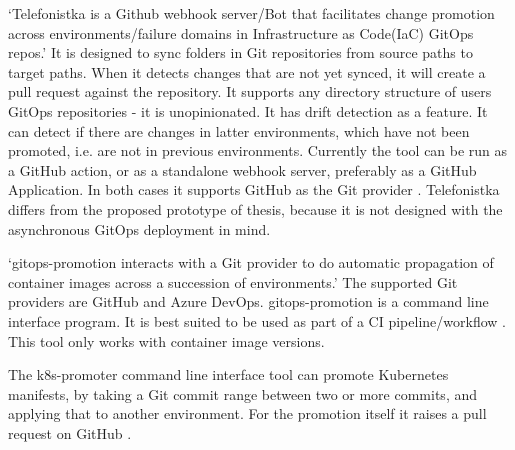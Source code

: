 \enquote*{Telefonistka is a Github webhook server/Bot that facilitates change promotion across environments/failure domains in Infrastructure as Code(IaC) GitOps repos.}
\autocite{telefonistka}
It is designed to sync folders in Git repositories from source paths to target paths.
When it detects changes that are not yet synced,
it will create a pull request against the repository.
It supports any directory structure of users GitOps repositories -
it is unopinionated.
It has drift detection as a feature. It can detect if there are changes in
latter environments, which have not been promoted, i.e. are not in previous environments.
Currently the tool can be run as a GitHub action, or as a
standalone webhook server, preferably as a GitHub Application.
In both cases it supports GitHub as the Git provider
\autocite{telefonistka}.
Telefonistka differs from the proposed prototype of thesis,
because it is not designed with the asynchronous GitOps deployment in mind.


\enquote*{gitops-promotion interacts with a Git provider to do automatic propagation of container images across a succession of environments.}
\autocite{xenitABgitopsPromotion}
The supported Git providers are GitHub and Azure DevOps.
gitops-promotion is a command line interface program.
It is best suited to be used as part of a CI pipeline/workflow
\autocite{xenitABgitopsPromotion}.
This tool only works with container image versions.


The k8s-promoter command line interface tool can promote Kubernetes manifests, by
taking a Git commit range between two or more commits, and applying that to another environment.
For the promotion itself it raises a pull request on GitHub
\autocite{form3techK8sPromoter}.


